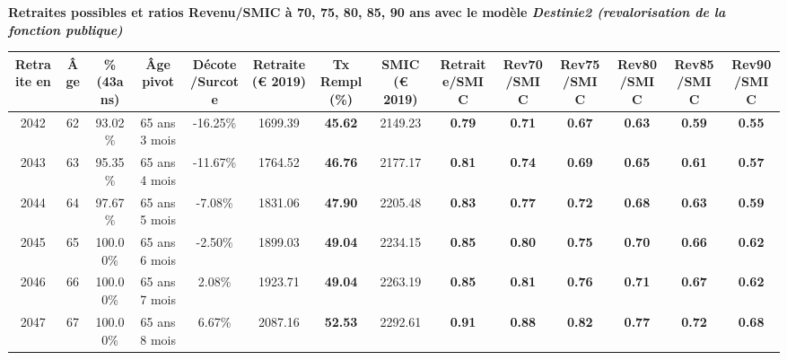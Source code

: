  \vspace{0.1cm} 
{\bf \noindent Retraites possibles et ratios Revenu/SMIC à 70, 75, 80, 85, 90 ans avec le modèle \emph{Destinie2 (revalorisation de la fonction publique)}}  
 
\begin{adjustbox}{max width=\textwidth} 
\begin{tabular}[htb]{|c|c||c|c|c||c|c||c||c|c|c|c|c|c|} 
\hline 
 Retraite en &  Âge &  \%(43ans) &  Âge pivot &  Décote/Surcote &  Retraite (\euro{} 2019) &  Tx Rempl(\%) &  SMIC (\euro{} 2019) &  Retraite/SMIC &  Rev70/SMIC &  Rev75/SMIC &  Rev80/SMIC &  Rev85/SMIC &  Rev90/SMIC \\ 
\hline \hline 
 2042 &  62 &  93.02\% &  65 ans 3 mois &  -16.25\% &  1699.39 &  {\bf 45.62} &  2149.23 &  {\bf {\color{red} 0.79}} &  {\bf {\color{red} 0.71}} &  {\bf {\color{red} 0.67}} &  {\bf {\color{red} 0.63}} &  {\bf {\color{red} 0.59}} &  {\bf {\color{red} 0.55}} \\ 
\hline 
 2043 &  63 &  95.35\% &  65 ans 4 mois &  -11.67\% &  1764.52 &  {\bf 46.76} &  2177.17 &  {\bf {\color{red} 0.81}} &  {\bf {\color{red} 0.74}} &  {\bf {\color{red} 0.69}} &  {\bf {\color{red} 0.65}} &  {\bf {\color{red} 0.61}} &  {\bf {\color{red} 0.57}} \\ 
\hline 
 2044 &  64 &  97.67\% &  65 ans 5 mois &  -7.08\% &  1831.06 &  {\bf 47.90} &  2205.48 &  {\bf {\color{red} 0.83}} &  {\bf {\color{red} 0.77}} &  {\bf {\color{red} 0.72}} &  {\bf {\color{red} 0.68}} &  {\bf {\color{red} 0.63}} &  {\bf {\color{red} 0.59}} \\ 
\hline 
 2045 &  65 &  100.00\% &  65 ans 6 mois &  -2.50\% &  1899.03 &  {\bf 49.04} &  2234.15 &  {\bf {\color{red} 0.85}} &  {\bf {\color{red} 0.80}} &  {\bf {\color{red} 0.75}} &  {\bf {\color{red} 0.70}} &  {\bf {\color{red} 0.66}} &  {\bf {\color{red} 0.62}} \\ 
\hline 
 2046 &  66 &  100.00\% &  65 ans 7 mois &  2.08\% &  1923.71 &  {\bf 49.04} &  2263.19 &  {\bf {\color{red} 0.85}} &  {\bf {\color{red} 0.81}} &  {\bf {\color{red} 0.76}} &  {\bf {\color{red} 0.71}} &  {\bf {\color{red} 0.67}} &  {\bf {\color{red} 0.62}} \\ 
\hline 
 2047 &  67 &  100.00\% &  65 ans 8 mois &  6.67\% &  2087.16 &  {\bf 52.53} &  2292.61 &  {\bf {\color{red} 0.91}} &  {\bf {\color{red} 0.88}} &  {\bf {\color{red} 0.82}} &  {\bf {\color{red} 0.77}} &  {\bf {\color{red} 0.72}} &  {\bf {\color{red} 0.68}} \\ 
\hline 
\hline 
\end{tabular} 
\end{adjustbox} 
 
